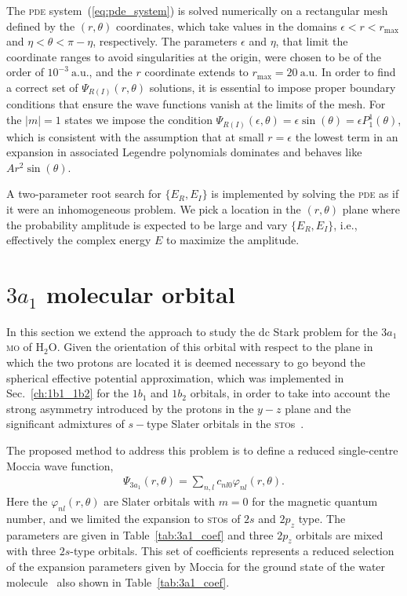 The \textsc{pde} system~(\ref{eq:pde_system}) is solved numerically on
a rectangular mesh defined by the $(r, \theta)$ coordinates, which
take values in the domains $\epsilon < r < r_{\mathrm{max}}$ and $\eta
< \theta < \pi - \eta$, respectively. The parameters $\epsilon$ and
$\eta$, that limit the coordinate ranges to avoid singularities at the
origin, were chosen to be of the order of $10^{-3}\ \mathrm{a.u.}$,
and the $r$ coordinate extends to $r_{\mathrm{max}} =
20\ \mathrm{a.u.}$ In order to find a correct set of
$\Psi_{R(I)}(r,\theta)$ solutions, it is essential to impose proper
boundary conditions that ensure the wave functions vanish at the
limits of the mesh. For the $|m| = 1$ states we impose the condition
$\Psi_{R(I)}(\epsilon,\theta) = \epsilon \sin(\theta) = \epsilon
P_{1}^{1}(\theta)$, which is consistent with the assumption that at
small $r = \epsilon$ the lowest term in an expansion in associated
Legendre polynomials dominates and behaves like $A r^{2}
\sin(\theta)$.

A two-parameter root search for $\{E_{R}, E_{I}\}$ is implemented by
solving the \textsc{pde} as if it were an inhomogeneous problem. We
pick a location in the $(r,\theta)$ plane where the probability
amplitude is expected to be large and vary $\{E_{R}, E_{I}\}$, i.e.,
effectively the complex energy $E$ to maximize the amplitude.


\section{$3a_{1}$ molecular orbital}
\label{ch:3a1}

In this section we extend the approach to study the dc Stark problem
for the $3a_{1}$ \textsc{mo} of H$_{2}$O. Given the orientation
of this orbital with respect to the plane in which the two protons are
located it is deemed necessary to go beyond the spherical effective
potential approximation, which was implemented in
Sec.~\ref{ch:1b1_1b2} for the $1b_{1}$ and $1b_{2}$ orbitals, in order
to take into account the strong asymmetry introduced by the protons in
the $y-z$ plane and the significant admixtures of $s-$type Slater
orbitals in the \textsc{sto}s~\cite{Moccia_1964}.

The proposed method to address this problem is to define a reduced
single-centre Moccia wave function,
%
\begin{eqnarray}
\Psi_{3a_{1}}(r,\theta) = \sum_{n,l} c_{nl0} \varphi_{nl}(r,\theta).
\label{eq:3a1Moccia_expansion}
\end{eqnarray}
%
Here the $\varphi_{nl}(r,\theta)$ are Slater orbitals with $m=0$ for
the magnetic quantum number, and we limited the expansion to
\textsc{sto}s of $2s$ and $2p_{z}$ type. The parameters are given in
Table~\ref{tab:3a1_coef} and three $2p_{z}$ orbitals are mixed with
three $2s$-type orbitals. This set of coefficients represents a
reduced selection of the expansion parameters given by Moccia for the
ground state of the water molecule~\cite{Moccia_1964} also shown in
Table~\ref{tab:3a1_coef}.

